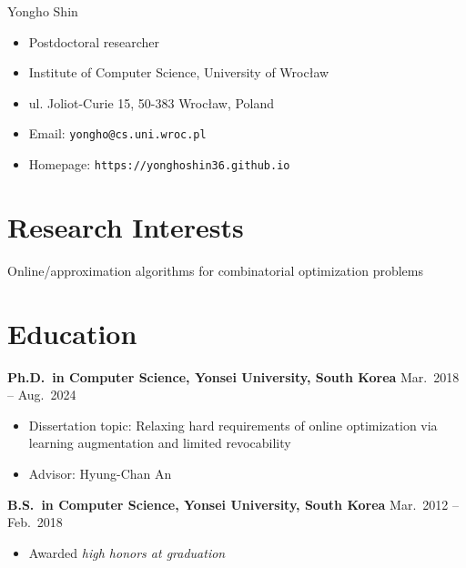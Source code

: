 \documentclass{article}
\newcommand{\killinitspace}{-0.7em}
\begin{document}
{\Huge Yongho Shin}
\begin{itemize}[itemsep=-3pt, leftmargin=2.5pt, label=]
\item Postdoctoral researcher
\item Institute of Computer Science, University of Wrocław
\item ul. Joliot-Curie 15, 50-383 Wrocław,  Poland
\item Email: \texttt{yongho@cs.uni.wroc.pl}
\item Homepage: \texttt{https://yonghoshin36.github.io}
\end{itemize}

\section{Research Interests}
Online/approximation algorithms for combinatorial optimization problems

\section{Education}
\textbf{Ph.D.~in Computer Science, Yonsei University, South Korea} \hfill Mar.~2018 -- Aug.~2024
\vspace{\killinitspace}
\begin{itemize}
\item Dissertation topic: Relaxing hard requirements of online optimization via learning augmentation and limited revocability
\item Advisor: Hyung-Chan An
\end{itemize}

\textbf{B.S.~in Computer Science, Yonsei University, South Korea} \hfill Mar.~2012 -- Feb.~2018
\vspace{\killinitspace}
\begin{itemize}
\item Awarded \textsl{high honors at graduation}
\end{itemize}
\end{document}
